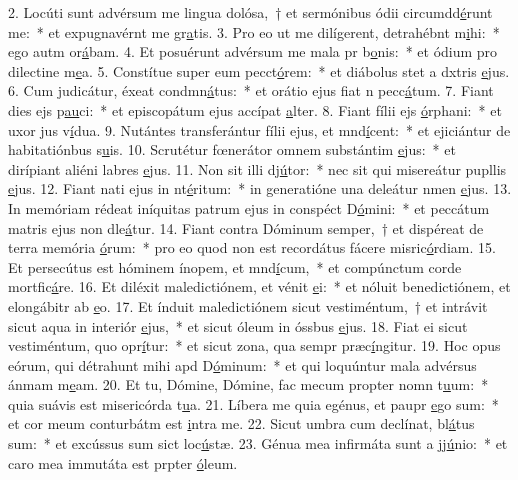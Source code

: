 2. Locúti sunt advérsum me lingua dolósa,~† et sermónibus ódii circumdd\uline{é}runt me:~* et expugnavérnt me gr\uline{a}tis.
3. Pro eo ut me dilígerent, detrahébnt m\uline{i}hi:~* ego autm or\uline{á}bam.
4. Et posuérunt advérsum me mala pr b\uline{o}nis:~* et ódium pro dilectine m\uline{e}a.
5. Constítue super eum pecct\uline{ó}rem:~* et diábolus stet a dxtris \uline{e}jus.
6. Cum judicátur, éxeat condmn\uline{á}tus:~* et orátio ejus fiat n pecc\uline{á}tum.
7. Fiant dies ejs p\uline{au}ci:~* et episcopátum ejus accípat \uline{a}lter.
8. Fiant fílii ejs \uline{ó}rphani:~* et uxor jus v\uline{í}dua.
9. Nutántes transferántur fílii ejus, et mnd\uline{í}cent:~* et ejiciántur de habitatiónbus s\uline{u}is.
10. Scrutétur fœnerátor omnem substántim \uline{e}jus:~* et dirípiant aliéni labres \uline{e}jus.
11. Non sit illi dj\uline{ú}tor:~* nec sit qui misereátur pupllis \uline{e}jus.
12. Fiant nati ejus in nt\uline{é}ritum:~* in generatióne una deleátur nmen \uline{e}jus.
13. In memóriam rédeat iníquitas patrum ejus in conspéct D\uline{ó}mini:~* et peccátum matris ejus non dle\uline{á}tur.
14. Fiant contra Dóminum semper,~† et dispéreat de terra memória \uline{ó}rum:~* pro eo quod non est recordátus fácere misric\uline{ó}rdiam.
15. Et persecútus est hóminem ínopem, et mnd\uline{í}cum,~* et compúnctum corde mortfic\uline{á}re.
16. Et diléxit maledictiónem, et vénit \uline{e}i:~* et nóluit benedictiónem, et elongábitr ab \uline{e}o.
17. Et índuit maledictiónem sicut vestiméntum,~† et intrávit sicut aqua in interiór \uline{e}jus,~* et sicut óleum in óssbus \uline{e}jus.
18. Fiat ei sicut vestiméntum, quo opr\uline{í}tur:~* et sicut zona, qua sempr præc\uline{í}ngitur.
19. Hoc opus eórum, qui détrahunt mihi apd D\uline{ó}minum:~* et qui loquúntur mala advérsus ánmam m\uline{e}am.
20. Et tu, Dómine, Dómine, fac mecum propter nomn t\uline{u}um:~* quia suávis est misericórda t\uline{u}a.
21. Líbera me quia egénus, et paupr \uline{e}go sum:~* et cor meum conturbátm est \uline{i}ntra me.
22. Sicut umbra cum declínat, bl\uline{á}tus sum:~* et excússus sum sict loc\uline{ú}stæ.
23. Génua mea infirmáta sunt a jj\uline{ú}nio:~* et caro mea immutáta est prpter \uline{ó}leum.
